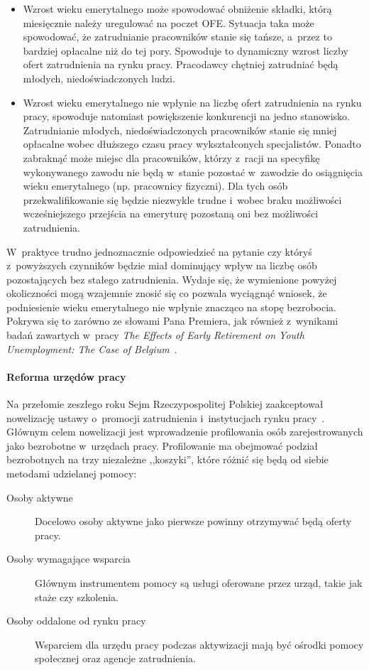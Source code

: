 \documentclass[12pt]{article}
\begin{document}
    \begin{itemize}
        \item Wzrost wieku emerytalnego może spowodować obniżenie składki, którą miesięcznie należy uregulować na poczet OFE. Sytuacja taka może spowodować, że zatrudnianie pracowników stanie się tańsze, a~przez to bardziej opłacalne niż do tej pory. Spowoduje to dynamiczny wzrost liczby ofert zatrudnienia na rynku pracy. Pracodawcy chętniej zatrudniać będą młodych, niedoświadczonych ludzi.
        \item Wzrost wieku emerytalnego nie wpłynie na liczbę ofert zatrudnienia na rynku pracy, spowoduje natomiast powiększenie konkurencji na jedno stanowisko. Zatrudnianie młodych, niedoświadczonych pracowników stanie się mniej opłacalne wobec dłuższego czasu pracy wykształconych specjalistów. Ponadto zabraknąć może miejsc dla pracowników, którzy z~racji na specyfikę wykonywanego zawodu nie będą w~stanie pozostać w~zawodzie do osiągnięcia wieku emerytalnego (np. pracownicy fizyczni). Dla tych osób przekwalifikowanie się będzie niezwykle trudne i~wobec braku możliwości wcześniejszego przejścia na emeryturę pozostaną oni bez możliwości zatrudnienia. 
    \end{itemize}
 
    W~praktyce trudno jednoznacznie odpowiedzieć na pytanie czy któryś z~powyższych czynników będzie miał dominujący wpływ na liczbę osób pozostających bez stałego zatrudnienia. Wydaje się, że wymienione powyżej okoliczności mogą wzajemnie znosić się co pozwala wyciągnąć wniosek, że podniesienie wieku emerytalnego nie wpłynie znacząco na stopę bezrobocia. Pokrywa się to zarówno ze słowami Pana Premiera, jak również z~wynikami badań zawartych w~pracy \emph{The Effects of Early Retirement on Youth Unemployment: The Case of Belgium}~\cite{imf}.
    
    \paragraph{Reforma urzędów pracy}
    
    Na przełomie zeszłego roku Sejm Rzeczypospolitej Polskiej zaakceptował nowelizację ustawy o~promocji zatrudnienia i~instytucjach rynku pracy~\cite{dz:u}. Głównym celem nowelizacji jest wprowadzenie profilowania osób zarejestrowanych jako bezrobotne w~urzędach pracy. Profilowanie ma obejmować podział bezrobotnych na trzy niezależne ,,koszyki'', które różnić się będą od siebie metodami udzielanej pomocy:
    
    \begin{description}
        \item[Osoby aktywne] Docelowo osoby aktywne jako pierwsze powinny otrzymywać będą oferty pracy. 
        \item[Osoby wymagające wsparcia] Głównym instrumentem pomocy są usługi oferowane przez urząd, takie jak staże czy szkolenia.
        \item[Osoby oddalone od rynku pracy] Wsparciem dla urzędu pracy podczas aktywizacji mają być ośrodki pomocy społecznej oraz agencje zatrudnienia.
    \end{description}
\end{document}
